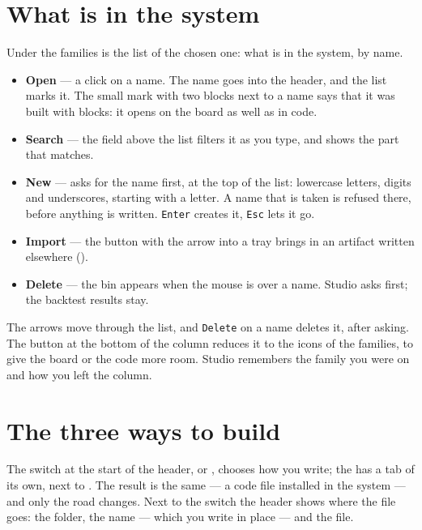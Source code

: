 \section{What is in the system}\label{sez:studio-list}

Under the families is the list of the chosen one: what is in the system,
by name.

\begin{itemize}
  \item \textbf{Open} --- a click on a name. The name goes into the header,
    and the list marks it. The small mark with two blocks next to a name says
    that it was built with blocks: it opens on the board as well as in code.
  \item \textbf{Search} --- the field above the list filters it as you
    type, and shows the part that matches.
  \item \textbf{New} --- \pulsantesec{+} asks for the name first, at the top
    of the list: lowercase letters, digits and underscores, starting with a
    letter. A name that is taken is refused there, before anything is
    written. \texttt{Enter} creates it, \texttt{Esc} lets it go.
  \item \textbf{Import} --- the button with the arrow into a tray brings in
    an artifact written elsewhere ().
  \item \textbf{Delete} --- the bin appears when the mouse is over a name.
    Studio asks first; the backtest results stay.
\end{itemize}

\noindent
The arrows move through the list, and \texttt{Delete} on a name deletes it,
after asking. The button at the bottom of the column reduces it to the icons
of the families, to give the board or the code more room. Studio remembers
the family you were on and how you left the column.

\section{The three ways to build}\label{sez:studio-modes}

The switch at the start of the header,  or ,
chooses how you write; the  has a tab of its own, next to
. The result is the same --- a code file installed in
the system --- and only the road changes. Next to the switch the header shows
where the file goes: the folder, the name --- which you write in place ---
and the file.

